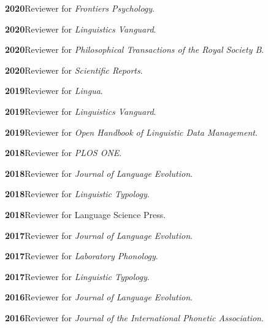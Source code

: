 \documentclass[11pt]{article}
\newcommand{\hangpara}{
 \setlength{\parindent}{0in} %
 \hangindent=0.42in %
}
\begin{document}
\vskip 6pt
\hangpara
{\bf 2020}\hspace{1ex}Reviewer for \textit{Frontiers Psychology}.

\vskip 6pt
\hangpara
{\bf 2020}\hspace{1ex}Reviewer for \textit{Linguistics Vanguard}.

\vskip 6pt
\hangpara
{\bf 2020}\hspace{1ex}Reviewer for \textit{Philosophical Transactions of the Royal Society B}.

\vskip 6pt
\hangpara
{\bf 2020}\hspace{1ex}Reviewer for \textit{Scientific Reports}.

\vskip 6pt
\hangpara
{\bf 2019}\hspace{1ex}Reviewer for \textit{Lingua}.

\vskip 6pt
\hangpara
{\bf 2019}\hspace{1ex}Reviewer for \textit{Linguistics Vanguard}.

\vskip 6pt
\hangpara
{\bf 2019}\hspace{1ex}Reviewer for \textit{Open Handbook of Linguistic Data Management}.

\vskip 6pt
\hangpara
{\bf 2018}\hspace{1ex}Reviewer for \textit{PLOS ONE}.

\vskip 6pt
\hangpara
{\bf 2018}\hspace{1ex}Reviewer for \textit{Journal of Language Evolution}.

\vskip 6pt
\hangpara
{\bf 2018}\hspace{1ex}Reviewer for \textit{Linguistic Typology}.

\vskip 6pt
\hangpara
{\bf 2018}\hspace{1ex}Reviewer for Language Science Press.

\vskip 6pt
\hangpara
{\bf 2017}\hspace{1ex}Reviewer for \textit{Journal of Language Evolution}.

\vskip 6pt
\hangpara
{\bf 2017}\hspace{1ex}Reviewer for \textit{Laboratory Phonology}.

\vskip 6pt
\hangpara
{\bf 2017}\hspace{1ex}Reviewer for \textit{Linguistic Typology}.

\vskip 6pt
\hangpara
{\bf 2016}\hspace{1ex}Reviewer for \textit{Journal of Language Evolution}.

\vskip 6pt
\hangpara
{\bf 2016}\hspace{1ex}Reviewer for \textit{Journal of the International Phonetic Association}.
\end{document}
